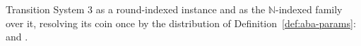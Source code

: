 \begin{definition}
  \label{def:aba-wcc-spec}
  \leanok
  Transition System 3 as a round-indexed instance and as the $\mathbb{N}$-indexed family over it, resolving its coin once by the distribution of Definition~\ref{def:aba-params}:  and .
\end{definition}
